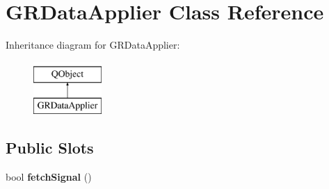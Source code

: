 \hypertarget{classGRDataApplier}{}\section{G\+R\+Data\+Applier Class Reference}
\label{classGRDataApplier}
Inheritance diagram for G\+R\+Data\+Applier\+:\begin{figure}[H]
\begin{center}
\leavevmode
\includegraphics[height=2.000000cm]{classGRDataApplier}
\end{center}
\end{figure}
\subsection*{Public Slots}
\begin{DoxyCompactItemize}
\item 
\mbox{\label{classGRDataApplier_aac7336f3f49ced3aaad29fc6fdb50024}} 
bool {\bfseries fetch\+Signal} ()
\end{DoxyCompactItemize}

